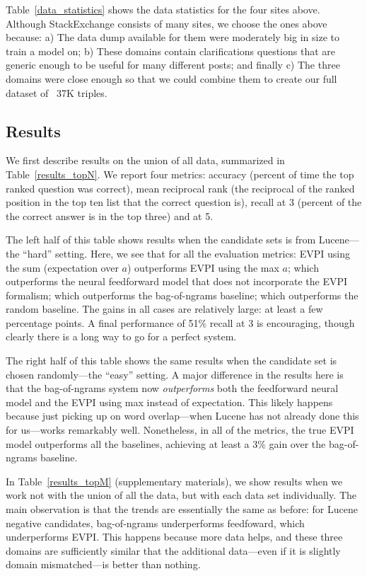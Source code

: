 \documentclass[11pt]{report}
\begin{document}
Table~\ref{data_statistics} shows the data statistics for the four sites above.  Although StackExchange consists of many sites, we choose the ones above because: a) The data dump available for them were moderately big in size to train a model on; b) These domains contain clarifications questions that are generic enough to be useful for many different posts; and finally c) The three domains were close enough so that we could combine them to create our full dataset of ~37K triples.

\subsection{Results}

We first describe results on the union of all data, summarized in Table~\ref{results_topN}.
We report four metrics: accuracy (percent of time the top ranked question was correct),
mean reciprocal rank (the reciprocal of the ranked position in the top ten list that the correct question is), 
recall at 3 (percent of the the correct answer is in the top three) and
at 5.

The left half of this table shows results when the candidate sets is from Lucene---the ``hard'' setting.
Here, we see that for all the evaluation metrics:
EVPI using the sum (expectation over $a$) outperforms
EVPI using the max $a$;
which outperforms the neural feedforward model that does not incorporate the EVPI formalism;
which outperforms the bag-of-ngrams baseline;
which outperforms the random baseline.
The gains in all cases are relatively large: at least a few percentage points.
A final performance of 51\% recall at 3 is encouraging, though clearly there is a long way to go for a perfect system.

The right half of this table shows the same results when the candidate set is chosen randomly---the ``easy'' setting.
A major difference in the results here is that the bag-of-ngrams system now \emph{outperforms} both the feedforward neural model and the EVPI using max instead of expectation.
This likely happens because just picking up on word overlap---when Lucene has not already done this for us---works remarkably well.
Nonetheless, in all of the metrics, the true EVPI model outperforms all the baselines, achieving at least a 3\% gain over the bag-of-ngrams baseline.

In Table~\ref{results_topM} (supplementary materials), we show results when we work not with the union of all the data, but with each data set individually.
The main observation is that the trends are essentially the same as before: for Lucene negative candidates, bag-of-ngrams underperforms feedfoward, which underperforms EVPI.
This happens because more data helps, and these three domains are sufficiently similar that the additional data---even if it is slightly domain mismatched---is better than nothing.
\end{document}
